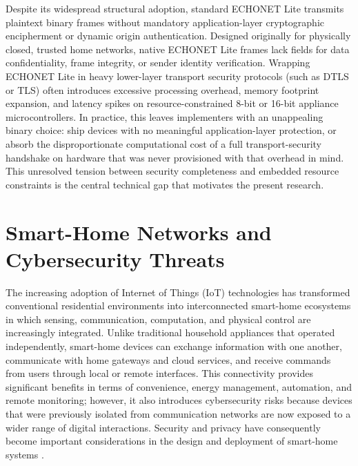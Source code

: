 Despite its widespread structural adoption, standard ECHONET Lite transmits plaintext binary frames without mandatory application-layer cryptographic encipherment or dynamic origin authentication. Designed originally for physically closed, trusted home networks, native ECHONET Lite frames lack fields for data confidentiality, frame integrity, or sender identity verification. Wrapping ECHONET Lite in heavy lower-layer transport security protocols (such as DTLS or TLS) often introduces excessive processing overhead, memory footprint expansion, and latency spikes on resource-constrained 8-bit or 16-bit appliance microcontrollers. In practice, this leaves implementers with an unappealing binary choice: ship devices with no meaningful application-layer protection, or absorb the disproportionate computational cost of a full transport-security handshake on hardware that was never provisioned with that overhead in mind. This unresolved tension between security completeness and embedded resource constraints is the central technical gap that motivates the present research.


\section{Smart-Home Networks and Cybersecurity Threats}

The increasing adoption of Internet of Things (IoT) technologies has transformed conventional residential environments into interconnected smart-home ecosystems in which sensing, communication, computation, and physical control are increasingly integrated. Unlike traditional household appliances that operated independently, smart-home devices can exchange information with one another, communicate with home gateways and cloud services, and receive commands from users through local or remote interfaces. This connectivity provides significant benefits in terms of convenience, energy management, automation, and remote monitoring; however, it also introduces cybersecurity risks because devices that were previously isolated from communication networks are now exposed to a wider range of digital interactions. Security and privacy have consequently become important considerations in the design and deployment of smart-home systems \citep{haneySmartHomeSecurity2020}.

